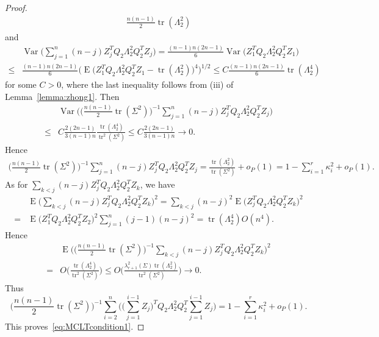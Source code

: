 \documentclass[review]{elsarticle}
\DeclareMathOperator{\mytr}{tr}
\DeclareMathOperator{\myE}{E}
\DeclareMathOperator{\myVar}{Var}
\theoremstyle{plain}
\theoremstyle{definition}
\theoremstyle{remark}
\begin{document}
\begin{proof}
$$\begin{aligned}
         \frac{n(n-1)}{2}\mytr (\Lambda_2^2)
     \end{aligned}
     $$
     and
     $$
     \begin{aligned}
         &\myVar\Big(\sum_{j=1}^{n} (n-j) Z_{j}^T Q_2 \Lambda_2^2 Q_2^T  Z_{j}\Big)=
         \frac{(n-1)n(2n-1)}{6}
         \myVar\big( Z_{1}^T Q_2 \Lambda_2^2 Q_2^T  Z_{1}\big)\\
         \leq&
         \frac{(n-1)n(2n-1)}{6}
         \Big(\myE\big( Z_{1}^T Q_2 \Lambda_2^2 Q_2^T  Z_{1}-\mytr(\Lambda_2^2)\big)^4\Big)^{1/2}\leq
         C
         \frac{(n-1)n(2n-1)}{6}
         \mytr(\Lambda_2^4)
     \end{aligned}
     $$
for some $C>0$,
     where the last inequality follows from (iii) of Lemma~\ref{lemma:zhong1}.
     Then
     $$
     \begin{aligned}
         &\myVar\Big(\big(\frac{n(n-1)}{2}\mytr (\Sigma^2)\big)^{-1}{\sum_{j=1}^{n} (n-j) Z_{j}^T Q_2 \Lambda_2^2 Q_2^T  Z_{j}}\Big)
         \\
         \leq&
         C\frac{2(2n-1)}{3(n-1)n}
         \frac{\mytr(\Lambda_2^4)}{\mytr^2(\Sigma^2)}
         \leq
         C\frac{2(2n-1)}{3(n-1)n}\to 0.
     \end{aligned}
     $$
     Hence
     $$
     \begin{aligned}
         \big(\frac{n(n-1)}{2}\mytr (\Sigma^2)\big)^{-1}
         {\sum_{j=1}^{n} (n-j) Z_{j}^T Q_2 \Lambda_2^2 Q_2^T  Z_{j}}=
         \frac{\mytr (\Lambda_2^2)}{\mytr(\Sigma^2)} +o_P(1)=1-\sum_{i=1}^r \kappa_i^2 +o_P(1).
     \end{aligned}
     $$
     As for $\sum_{k<j} (n-j)Z_j^T Q_2 \Lambda_2^2 Q_2^T Z_k$, we have
     $$
     \begin{aligned}
         &\myE \big(
    \sum_{k<j} (n-j)Z_j^T Q_2 \Lambda_2^2 Q_2^T Z_k 
     \big)^2
     =
    \sum_{k<j} (n-j)^2 \myE \big(Z_j^T Q_2 \Lambda_2^2 Q_2^T Z_k 
     \big)^2
         \\
         =&
\myE \big(Z_1^T Q_2 \Lambda_2^2 Q_2^T Z_2 
     \big)^2
         \sum_{j=1}^n (j-1)(n-j)^2      
         =\mytr(\Lambda_2^4) O(n^4).
     \end{aligned}
     $$
     Hence
     $$
     \begin{aligned}
         &\myE\Big(
         \big(\frac{n(n-1)}{2}\mytr (\Sigma^2)\big)^{-1}
    \sum_{k<j} (n-j)Z_j^T Q_2 \Lambda_2^2 Q_2^T Z_k 
\Big)^2\\
         =&
O\Big(\frac{\mytr(\Lambda_2^4)}{\mytr^2(\Sigma^2)}\Big)\leq
O\Big(\frac{\lambda_{r+1}^2(\Sigma)\mytr(\Lambda_2^2)}{\mytr^2(\Sigma^2)}\Big)
\to 0.
     \end{aligned}
     $$
     Thus
     $$
         \big(\frac{n(n-1)}{2}\mytr (\Sigma^2)\big)^{-1} \sum_{i=2}^n \Big(\big(\sum_{j=1}^{i-1} Z_{j}\big)^T Q_2 \Lambda_2^2 Q_2^T \sum_{j=1}^{i-1} Z_{j}\Big)
         = 1-\sum_{i=1}^r \kappa_i^2+o_P(1).
     $$
     This proves~\eqref{eq:MCLTcondition1}.
     

\end{proof}
\end{document}
